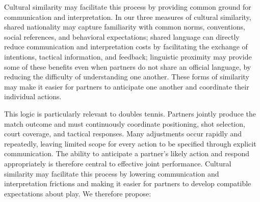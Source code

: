 \documentclass[10pt]{article}
\begin{document}
Cultural similarity may facilitate this process by providing common ground for communication and interpretation. In our three measures of cultural similarity,  shared nationality may capture familiarity with common norms, conventions, social references, and behavioral expectations; shared language can directly reduce communication and interpretation costs by facilitating the exchange of intentions, tactical information, and feedback; linguistic proximity may provide some of these benefits even when partners do not share an official language, by reducing the difficulty of understanding one another. These forms of similarity may make it easier for partners to anticipate one another and coordinate their individual actions. %


This logic is particularly relevant to doubles tennis. Partners jointly produce the match outcome and must continuously coordinate positioning, shot selection, court coverage, and tactical responses. Many adjustments occur rapidly and repeatedly, leaving limited scope for every action to be specified through explicit communication. The ability to anticipate a partner’s likely action and respond appropriately is therefore central to effective joint performance. Cultural similarity may facilitate this process by lowering communication and interpretation frictions and making it easier for partners to develop compatible expectations about play. We therefore propose:

\end{document}
